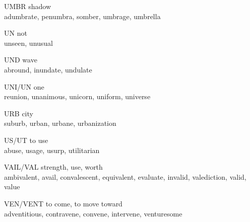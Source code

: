 \begin{flashcard}[Roots]{UMBR}
shadow\\
\vspace{0.2in}
adumbrate, penumbra, somber, umbrage, umbrella\\
\end{flashcard}

\begin{flashcard}[Roots]{UN}
not\\
\vspace{0.2in}
unseen, unusual\\
\end{flashcard}

\begin{flashcard}[Roots]{UND}
wave\\
\vspace{0.2in}
abround, inundate, undulate\\
\end{flashcard}

\begin{flashcard}[Roots]{UNI/UN}
one\\
\vspace{0.2in}
reunion, unanimous, unicorn, uniform, universe\\
\end{flashcard}

\begin{flashcard}[Roots]{URB}
city\\
\vspace{0.2in}
suburb, urban, urbane, urbanization\\
\end{flashcard}

\begin{flashcard}[Roots]{US/UT}
to use\\
\vspace{0.2in}
abuse, usage, usurp, utilitarian\\
\end{flashcard}

\begin{flashcard}[Roots]{VAIL/VAL}
strength, use, worth\\
\vspace{0.2in}
ambivalent, avail, convalescent, equivalent, evaluate, invalid, valediction, valid, value\\
\end{flashcard}

\begin{flashcard}[Roots]{VEN/VENT}
to come, to move toward\\
\vspace{0.2in}
adventitious, contravene, convene, intervene, venturesome\\
\end{flashcard}

